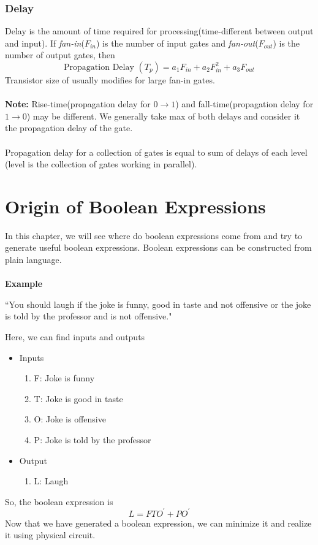 \documentclass[oneside]{book}
\begin{document}
\subsection{Delay}
Delay is the amount of time required for processing(time-different between output and input). If \textit{fan-in}(\(F_{in}\)) is the number of input gates and \textit{fan-out}(\(F_{out}\)) is the number of output gates, then
\[
	\text{Propagation Delay } (T_p) = a_1F_{in} + a_2F_{in}^2 + a_3F_{out}
\]
Transistor size of usually modifies for large fan-in gates.
\\\\
\noindent\textbf{Note: } Rise-time(propagation delay for \(0 \to 1\)) and fall-time(propagation delay for \(1 \to 0\)) may be different. We generally take max of both delays and consider it the propagation delay of the gate.
\\\\
\noindent Propagation delay for a collection of gates is equal to sum of delays of each level (level is the collection of gates working in parallel).

\chapter{Origin of Boolean Expressions}
In this chapter, we will see where do boolean expressions come from and try to generate useful boolean expressions. Boolean expressions can be constructed from plain language.
\\\\
\noindent\textbf{Example}
\begin{center}
	``You should laugh if the joke is funny, good in taste and not offensive or the joke is told by the professor and is not offensive."
\end{center}

\noindent Here, we can find inputs and outputs
\begin{itemize}
	\item Inputs
	      \begin{enumerate}
		      \item F: Joke is funny
		      \item T: Joke is good in taste
		      \item O: Joke is offensive
		      \item P: Joke is told by the professor
	      \end{enumerate}
	\item Output
	      \begin{enumerate}
		      \item L: Laugh
	      \end{enumerate}
\end{itemize}
So, the boolean expression is
\[
	L = FTO^\prime + PO^\prime
\]
Now that we have generated a boolean expression, we can minimize it and realize it using physical circuit.
\end{document}
